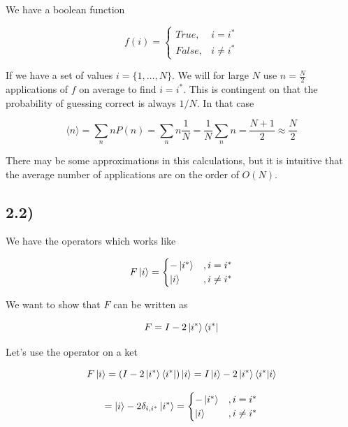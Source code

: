 \documentclass[a4paper,norsk, 10pt]{article}
\begin{document}
We have a boolean function

\begin{equation}
f(i)=
\begin{cases}
True, & i = i^* \\
False, & i \neq i^*
\end{cases}
\end{equation}

If we have a set of values $i = \{1,\ldots, N\}$. We will for large $N$ use $n = \frac{N}{2}$ applications of $f$ on average to find $i = i^*$. This is contingent on that the probability of guessing correct is always $1/N$. In that case

\begin{equation}
\langle n \rangle = \sum_n nP(n) = \sum_n n \frac{1}{N} = \frac{1}{N}\sum_n n = \frac{N+1}{2} \approx \frac{N}{2}
\end{equation}

There may be some approximations in this calculations, but it is intuitive that the average number of applications are on the order of $O(N)$.

\subsection{2.2)}

We have the operators which works like

\begin{equation}
F\ket{i} = 
\begin{cases}
-\ket{i^*} & , i = i^* \\
\ket{i} & , i \neq i^*
\end{cases}
\label{eq:Feffect}
\end{equation}

We want to show that $F$ can be written as

\begin{equation}
F = I - 2\ket{i^*}\bra{i^*}
\label{eq:Foperator}
\end{equation}

Let's use the operator on a ket

\begin{equation*}
F\ket{i} = (I - 2\ket{i^*}\bra{i^*})\ket{i} = I\ket{i} - 2\ket{i^*}\bra{i^*}\ket{i}
\end{equation*}

\begin{equation}
= \ket{i} - 2\delta_{i,i^*}\ket{i^*} =
\begin{cases}
-\ket{i^*} & , i = i^* \\
\ket{i} & , i \neq i^*
\end{cases}
\end{equation}
\end{document}

